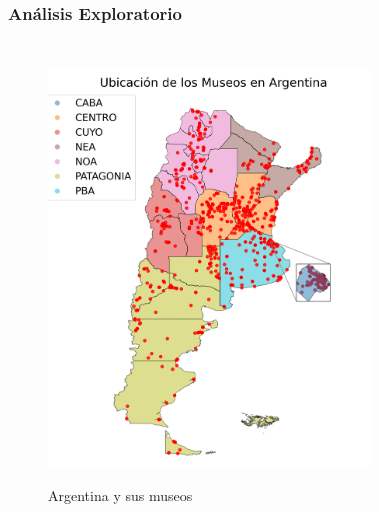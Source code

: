 \documentclass[10pt]{beamer}
\begin{document}
\begin{frame}
\frametitle{Análisis Exploratorio}

\begin{columns}
\begin{figure}
\vspace{-2.75em}
\includegraphics[width=\textwidth]{museos_datosabiertos.png}
\label{fig:museos}
\caption{Argentina y sus museos}
\end{figure}
\begin{figure}


\end{figure}
\end{columns}
\end{frame}
\end{document}

